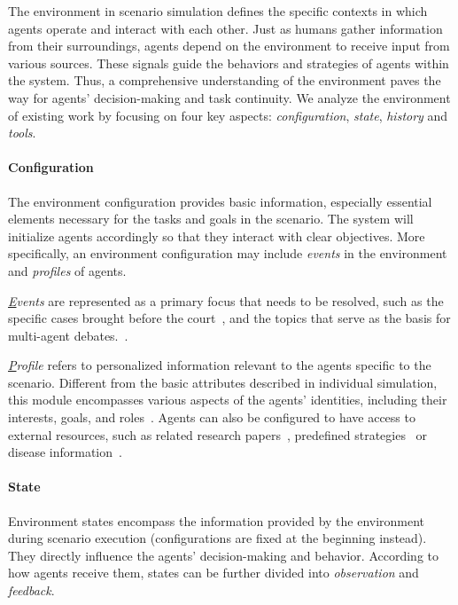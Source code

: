 The environment in scenario simulation defines the specific contexts in which agents operate and interact with each other. Just as humans gather information from their surroundings, agents depend on the environment to receive input from various sources. These signals guide the behaviors and strategies of agents within the system. Thus, a comprehensive understanding of the environment paves the way for agents' decision-making and task continuity. We analyze the environment of existing work by focusing on four key aspects: \textit{configuration}, \textit{state}, \textit{history} and \textit{tools}.

\paragraph{Configuration}

The environment configuration provides basic information, especially essential elements necessary for the tasks and goals in the scenario.
The system will initialize agents accordingly so that they interact with clear objectives.
More specifically, an environment configuration may include \textit{events} in the environment and \textit{profiles} of agents.

\textit{{\ul Events}} are represented as a primary focus that needs to be resolved, such as the specific cases brought before the court~\cite{hamilton2023blind,he2024simucourt,sun2024lawluo,baker2024simulating}, and the topics that serve as the basis for multi-agent debates.~\cite{xiong2023examining,du2023improving,liang2023encouraging,chan2023chateval,wu2023autogen,xia2024measuring,ma2024debate}.

\textit{{\ul Profile}} refers to personalized information relevant to the agents specific to the scenario. Different from the basic attributes described in individual simulation, this module encompasses various aspects of the agents' identities, including their interests, goals, and roles~\cite{hong2023metagpt,yukhymenko2024synthetic,zhang2024self}.
Agents can also be configured to have access to external resources, such as related research papers~\cite{baek2024researchagent}, predefined strategies~\cite{zhang2024self} or disease information~\cite{li2024agent}.

\paragraph{State}

Environment states encompass the information provided by the environment during scenario execution (configurations are fixed at the beginning instead).
They directly influence the agents' decision-making and behavior.
According to how agents receive them, states can be further divided into \textit{observation} and \textit{feedback}.

